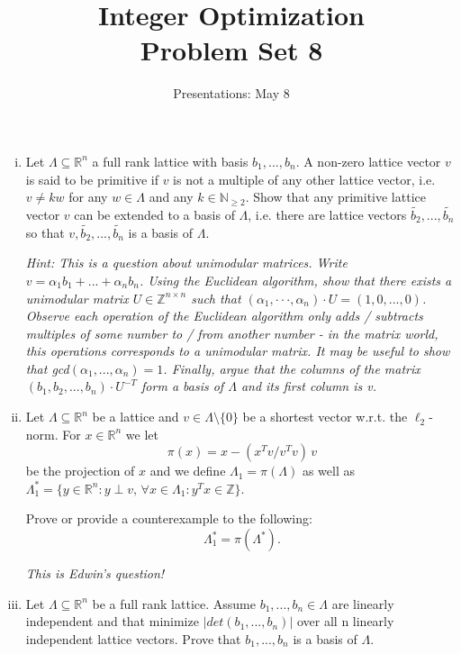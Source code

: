 \documentclass{article}
\title{Integer Optimization \\ Problem Set 8}
\date{Presentations: May 8}
\def\RR{\mathbb{R}}
\begin{document}
\maketitle


\begin{enumerate}[i)]
\item 
 Let $\Lambda \subseteq \mathbb{R}^n$ a full rank lattice with basis $b_1, ... , b_n$. A non-zero lattice vector $v$ is said to be primitive if $v$ is not 
 a multiple of any other lattice vector, i.e. $v \neq kw$ for any $w \in \Lambda$ and any $k \in \mathbb{N}_{\geq 2}$. Show that any primitive lattice 
 vector $v$ can be extended to a basis of $\Lambda$, i.e. there are lattice vectors 
 $\tilde{b_2}, ... , \tilde{b_n}$ so that $v, \tilde{b_2}, ... , \tilde{b_n}$ is a basis of $\Lambda$.

 
\emph{Hint: This is a question about unimodular matrices. Write $v = \alpha_1 b_1 + ... + \alpha_n b_n$. Using the Euclidean algorithm, show that there 
exists a unimodular matrix $U \in \mathbb{Z}^{n\times n}$ such that $(\alpha_1, · · · , \alpha_n) \cdot U = (1, 0, ... , 0)$. Observe each operation of the 
Euclidean algorithm only adds / subtracts multiples of some number to / from another number - in the matrix world, this operations corresponds to a 
unimodular matrix. It may be useful to show that gcd$(\alpha_1, ... , \alpha_n) = 1$. Finally, argue that the columns of the matrix $(b_1, b_2, ... , b_n)\cdot U^{-T}$ 
form a basis of $\Lambda$ and its first column is v.}


\item Let $Λ ⊆\mathbb{R}^n$ be a lattice and $v ∈ Λ \setminus \{0\}$ be a shortest vector w.r.t. the $\ell_2$-norm. For $x \in \mathbb{R}^n$ we let
  \begin{displaymath}
    π(x) = x - (x^Tv / v^Tv )\, v
  \end{displaymath}
  be the projection of $x$ and we define $Λ_1 = π(Λ)$ as well as $Λ_1^* = \{ y \in \mathbb{R}^n \colon y \perp v, \, \forall x ∈ Λ_1 \colon y^T x \in \mathbb{Z}\}$.

  Prove or provide a counterexample to the following:
  \begin{displaymath}
    Λ_1^* = π(Λ^*).  
  \end{displaymath}

  \hfill \emph{This is Edwin's question!}


\item 
Let $\Lambda \subseteq \RR^n$ be a full rank lattice. Assume $b_1,... ,b_n \in \Lambda$ are linearly independent and that minimize
$|det(b_1,... ,b_n)|$ over all n linearly independent lattice vectors. Prove that $b_1,... ,b_n$ is a basis of $\Lambda$.


\end{enumerate}
\end{document}

